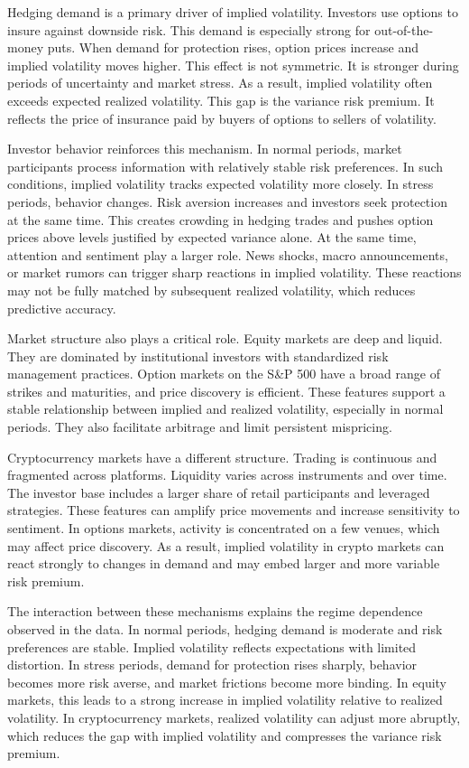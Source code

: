 \documentclass[11pt,a4paper,openany]{report}
\begin{document}
Hedging demand is a primary driver of implied volatility. Investors use
options to insure against downside risk. This demand is especially
strong for out-of-the-money puts. When demand for protection rises,
option prices increase and implied volatility moves higher. This effect
is not symmetric. It is stronger during periods of uncertainty and
market stress. As a result, implied volatility often exceeds expected
realized volatility. This gap is the variance risk premium. It reflects
the price of insurance paid by buyers of options to sellers of
volatility.

Investor behavior reinforces this mechanism. In normal periods, market
participants process information with relatively stable risk
preferences. In such conditions, implied volatility tracks expected
volatility more closely. In stress periods, behavior changes. Risk
aversion increases and investors seek protection at the same time. This
creates crowding in hedging trades and pushes option prices above levels
justified by expected variance alone. At the same time, attention and
sentiment play a larger role. News shocks, macro announcements, or
market rumors can trigger sharp reactions in implied volatility. These
reactions may not be fully matched by subsequent realized volatility,
which reduces predictive accuracy.

Market structure also plays a critical role. Equity markets are deep and
liquid. They are dominated by institutional investors with standardized
risk management practices. Option markets on the S\&P 500 have a broad
range of strikes and maturities, and price discovery is efficient. These
features support a stable relationship between implied and realized
volatility, especially in normal periods. They also facilitate arbitrage
and limit persistent mispricing.

Cryptocurrency markets have a different structure. Trading is continuous
and fragmented across platforms. Liquidity varies across instruments and
over time. The investor base includes a larger share of retail
participants and leveraged strategies. These features can amplify price
movements and increase sensitivity to sentiment. In options markets,
activity is concentrated on a few venues, which may affect price
discovery. As a result, implied volatility in crypto markets can react
strongly to changes in demand and may embed larger and more variable
risk premium.

The interaction between these mechanisms explains the regime dependence
observed in the data. In normal periods, hedging demand is moderate and
risk preferences are stable. Implied volatility reflects expectations
with limited distortion. In stress periods, demand for protection rises
sharply, behavior becomes more risk averse, and market frictions become
more binding. In equity markets, this leads to a strong increase in
implied volatility relative to realized volatility. In cryptocurrency
markets, realized volatility can adjust more abruptly, which reduces the
gap with implied volatility and compresses the variance risk premium.
\end{document}
